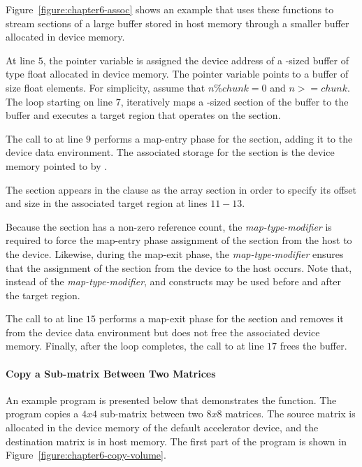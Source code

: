 Figure~\ref{figure:chapter6-assoc} 
shows an example that uses these functions to stream sections of a large
buffer stored in host memory through a smaller buffer allocated in device
memory.


At line $5$, the pointer variable  is assigned the device address of
a -sized buffer of type float allocated in device memory.
The pointer variable  points to a buffer of size  float elements.  
For simplicity, assume that $n \% chunk = 0$ and $n >= chunk$.
The loop starting on line $7$, iteratively maps a -sized section of
the  buffer to the  buffer and executes a target region that
operates on the section.

The call to  at line $9$ performs a map-entry
phase for the section, adding it to the device data
environment.  The associated storage for the section is the device memory pointed
to by .

The section appears in the  clause as the array section  in order to
specify its offset and size in the associated target region at lines $11-13$.

Because the section has a non-zero reference count, the 
\emph{map-type-modifier} is required to force the map-entry phase assignment of the
section from the host to the device.
Likewise, during the map-exit phase,
the  \emph{map-type-modifier} ensures that the assignment of the
section from the device to the host occurs.
Note that, instead of the  \emph{map-type-modifier}, 
 and 
constructs may be used before and after the target region.

The call to  at line $15$ performs a 
map-exit phase for the section and removes it from
the device data environment but does not free the associated
device memory.
Finally, after the loop completes, the call to 
at line $17$ frees the  buffer. 

\paragraph{Copy a Sub-matrix Between Two Matrices}

An example program is presented below that demonstrates the 
 function. 
The program copies a $4x4$ sub-matrix between two $8x8$ matrices.  
The source matrix is allocated in the device memory of the
default accelerator device, and the destination matrix is in host memory.
The first part of the program is shown in Figure~\ref{figure:chapter6-copy-volume}.

